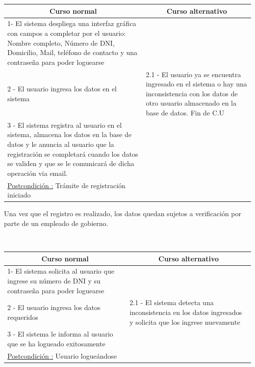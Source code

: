 \begin{center}
    \centering
    \begin{tabular}{ | p{11cm} | p{6cm} | }
    	\multicolumn{1}{c}{\cellcolor{black!30}\textbf{Curso normal}} & 
    	\multicolumn{1}{c}{\cellcolor{black!30}\textbf{Curso alternativo}} \\
		\hline
		1- El sistema despliega una interfaz gráfica con campos a completar
		por el usuario: Nombre completo, Número de DNI, Domicilio, Mail, teléfono
		de contacto y una contrase\~na para poder loguearse & \\ \hline
		2 - El usuario ingresa los datos en el sistema & 2.1 - El usuario ya se encuentra ingresado en el sistema
		o hay una inconsistencia con los datos de otro usuario almacenado en la base de datos. Fin de C.U \\ \hline
		3 - El sistema registra al usuario en el sistema, almacena los datos en la base de datos y le anuncia al usuario que la registración se completará cuando los datos se validen y que se le comunicará de dicha operación via email.& \\ \hline
		\underline{Postcondición :} Trámite de registración iniciado & \\ \hline
    \end{tabular}
\end{center}

Una vez que el registro es realizado, los datos quedan sujetos a verificación por parte de un empleado de gobierno.

~

\begin{center}
    \centering
    \begin{tabular}{ | p{11cm} | p{6cm} | }
    	\multicolumn{1}{c}{\cellcolor{black!30}\textbf{Curso normal}} & 
    	\multicolumn{1}{c}{\cellcolor{black!30}\textbf{Curso alternativo}} \\
		\hline
		1- El sistema solicita al usuario que ingrese su número de DNI y su contrase\~na para poder loguearse
		&  \\ \hline
		2 - El usuario ingresa los datos requeridos & 2.1 - El sistema detecta una inconsistencia en los datos ingresados y
		solicita que los ingrese nuevamente \\ \hline
		3 - El sistema le informa al usuario que se ha logueado exitosamente & \\ \hline
		\underline{Postcondición :} Usuario logueándose & \\ \hline
    \end{tabular}
\end{center}

